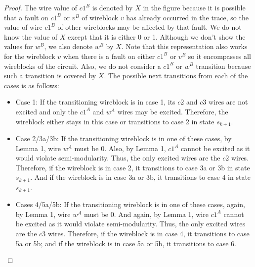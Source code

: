 \documentclass[12pt]{report}
\begin{document}
\begin{proof}
The wire value of $c1^B$ is denoted by $X$ in the figure because it is possible that a fault on $c1^B$ or $v^B$ of wireblock $v$ has already occurred in the trace, so the value of wire $c1^B$ of other wireblocks may be affected by that fault. We do not know the value of $X$ except that it is either 0 or 1. Although we don't show the values for $w^B$, we also denote $w^B$ by $X$. Note that this representation also works for the wireblock $v$ when there is a fault on either $c1^B$ or $v^B$ so it encompasses all wireblocks of the circuit.
Also, we do not consider a $c1^B$ or $w^B$ transition because such a transition is covered by $X$. %
The possible next transitions from each of the cases is as follows:
\begin{itemize}
\item
Case 1: If the transitioning wireblock is in case 1, its $c2$ and $c3$ wires are not excited and only the $c1^A$ and $w^A$ wires may be excited. Therefore, the wireblock either stays in this case or transitions to case 2 in state $s_{k+1}$. %
\item
Case 2/3a/3b: If the transitioning wireblock is in one of these cases, by Lemma 1, wire $w^A$ must be 0. Also, by Lemma 1, $c1^A$ cannot be excited as it would violate semi-modularity. Thus, the only excited wires are the $c2$ wires. 
Therefore, if the wireblock is in case 2, it transitions to case 3a or 3b in state $s_{k+1}$. And if the wireblock is in case 3a or 3b, it transitions to case 4 in state $s_{k+1}$.
\item
Cases 4/5a/5b: If the transitioning wireblock is in one of these cases, again, by Lemma 1, wire $w^A$ must be 0. And again, by Lemma 1, wire $c1^A$ cannot be excited as it would violate semi-modularity. Thus, the only excited wires are the $c3$ wires. Therefore, if the wireblock is in case 4, it transitions to case 5a or 5b; and if the wireblock is in case 5a or 5b, it transitions to case 6.

\end{itemize}
\end{proof}
\end{document}
